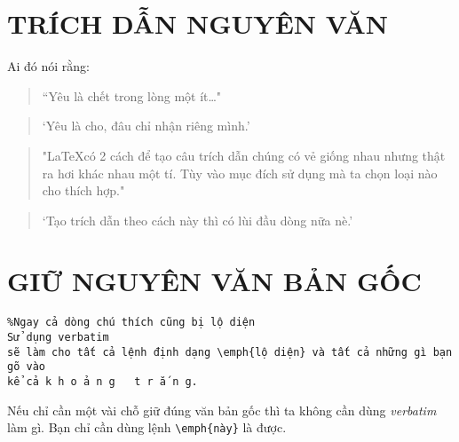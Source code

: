 \documentclass{article}
\begin{document}
\section{TRÍCH DẪN NGUYÊN VĂN}
Ai đó nói rằng:
\begin{quote}
``Yêu là chết trong lòng một ít\ldots"
\end{quote}
\begin{quote}
`Yêu là cho, đâu chỉ nhận riêng mình.'
\end{quote}

\begin{quotation}
"\LaTeX có 2 cách để tạo câu trích dẫn chúng có vẻ giống nhau nhưng thật ra hơi khác nhau một tí. Tùy vào mục đích sử dụng mà ta chọn loại nào cho thích hợp."
\end{quotation}
\begin{quotation}
`Tạo trích dẫn theo cách này thì có lùi đầu dòng nữa nè.'
\end{quotation}

\section{GIỮ NGUYÊN VĂN BẢN GỐC}
\begin{verbatim} 
%Ngay cả dòng chú thích cũng bị lộ diện
Sử dụng verbatim
sẽ làm cho tất cả lệnh định dạng \emph{lộ diện} và tất cả những gì bạn gõ vào
kể cả k h o ả n g   t r ắ n g.
\end{verbatim}

Nếu chỉ cần một vài chỗ giữ đúng văn bản gốc thì ta không cần dùng \emph{verbatim} làm gì. Bạn chỉ cần dùng lệnh \verb=\emph{này}= là được.
\end{document}
